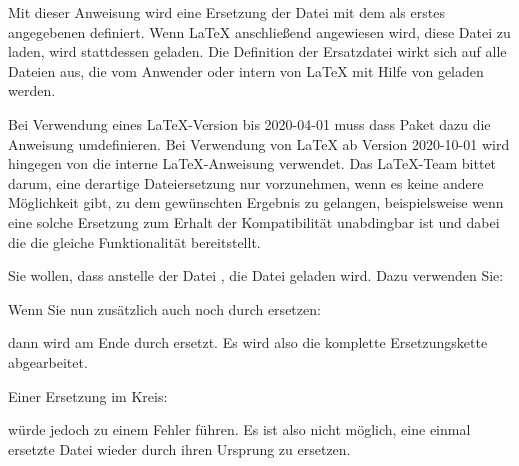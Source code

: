 \begin{Declaration}[0]
\end{Declaration}
Mit dieser Anweisung wird eine Ersetzung
der Datei mit dem als erstes angegebenen  definiert. Wenn
\LaTeX{} anschließend angewiesen wird, diese Datei zu laden, wird stattdessen
 geladen. Die Definition der Ersatzdatei wirkt sich auf
alle Dateien aus, die vom Anwender oder intern von \LaTeX{} mit Hilfe von
 geladen werden.

Bei Verwendung eines \LaTeX-Version bis
2020-04-01 muss dass Paket  dazu die Anweisung
 umdefinieren. Bei Verwendung von \LaTeX{} ab Version
2020-10-01 wird hingegen von  die interne
\LaTeX-Anweisung  verwendet. Das
\LaTeX{}-Team bittet darum, eine derartige Dateiersetzung nur vorzunehmen,
wenn es keine andere Möglichkeit gibt, zu dem gewünschten Ergebnis zu
gelangen, beispielsweise wenn eine solche Ersetzung zum Erhalt der
Kompatibilität unabdingbar ist und dabei die  die gleiche
Funktionalität bereitstellt.

\begin{Example}
  Sie wollen, dass anstelle der Datei , die Datei
   geladen wird. Dazu verwenden Sie:
\begin{lstcode}
\end{lstcode}
  Wenn Sie nun zusätzlich  auch noch durch
   ersetzen:
\begin{lstcode}
\end{lstcode}
  dann wird  am Ende durch
   ersetzt. Es wird also die komplette
  Ersetzungskette abgearbeitet.

  Einer Ersetzung im Kreis:
\begin{lstcode}
\end{lstcode}
  würde jedoch zu einem Fehler führen. Es ist also nicht möglich, eine einmal
  ersetzte Datei wieder durch ihren Ursprung zu ersetzen.
\end{Example}

